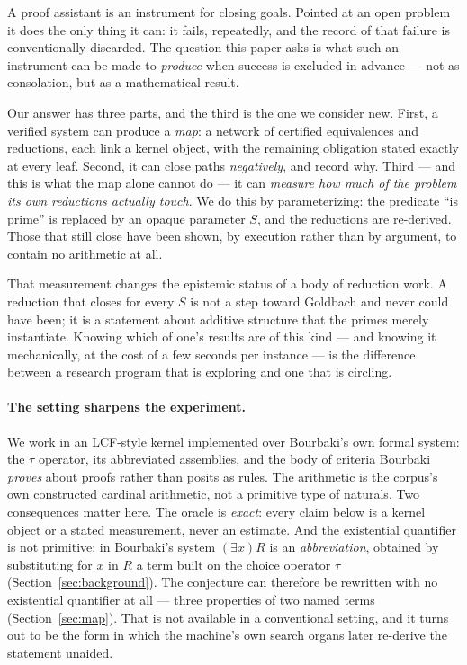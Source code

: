 \documentclass[11pt]{article}
\theoremstyle{remark}\newtheorem{remark}{Remark}
\begin{document}
A proof assistant is an instrument for closing goals. Pointed at an open problem it
does the only thing it can: it fails, repeatedly, and the record of that failure is
conventionally discarded. The question this paper asks is what such an instrument can
be made to \emph{produce} when success is excluded in advance --- not as consolation,
but as a mathematical result.

Our answer has three parts, and the third is the one we consider new. First, a
verified system can produce a \emph{map}: a network of certified equivalences and
reductions, each link a kernel object, with the remaining obligation stated exactly at
every leaf. Second, it can close paths \emph{negatively}, and record why. Third --- and
this is what the map alone cannot do --- it can \emph{measure how much of the problem
its own reductions actually touch}. We do this by parameterizing: the predicate
``is prime'' is replaced by an opaque parameter $S$, and the reductions are re-derived.
Those that still close have been shown, by execution rather than by argument, to
contain no arithmetic at all.

That measurement changes the epistemic status of a body of reduction work. A
reduction that closes for every $S$ is not a step toward Goldbach and never could have
been; it is a statement about additive structure that the primes merely instantiate.
Knowing which of one's results are of this kind --- and knowing it mechanically, at the
cost of a few seconds per instance --- is the difference between a research program that
is exploring and one that is circling.

\paragraph{The setting sharpens the experiment.} We work in an LCF-style kernel
implemented over Bourbaki's own formal system: the $\tau$ operator, its abbreviated
assemblies, and the body of criteria Bourbaki \emph{proves} about proofs rather than
posits as rules. The arithmetic is the corpus's own constructed cardinal arithmetic,
not a primitive type of naturals. Two consequences matter here. The oracle is
\emph{exact}: every claim below is a kernel object or a stated measurement, never an
estimate. And the existential quantifier is not primitive: in Bourbaki's system
$(\exists x)R$ is an \emph{abbreviation}, obtained by substituting for $x$ in $R$ a term
built on the choice operator $\tau$ (Section~\ref{sec:background}). The conjecture can
therefore be rewritten with no existential quantifier at all --- three properties of two
named terms (Section~\ref{sec:map}). That is not available in a conventional setting, and it turns
out to be the form in which the machine's own search organs later re-derive the
statement unaided.
\end{document}
